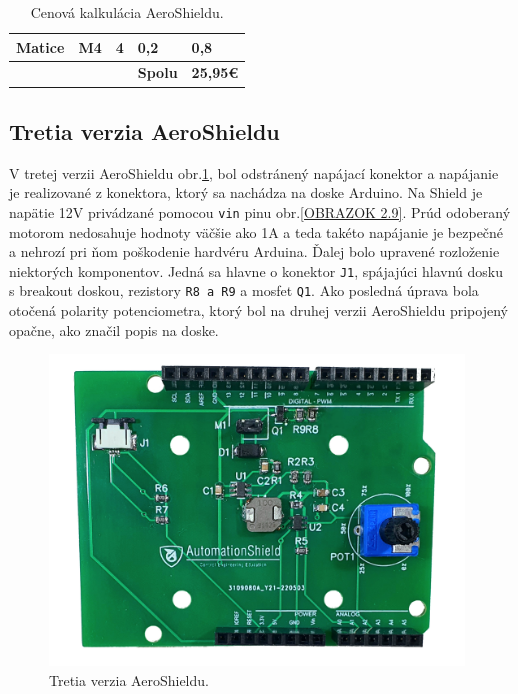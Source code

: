 \begin{table}
\begin{tabular}{p{} p{} p{} p{} p{}}
		Matice                              & M4                                                 & 4                                  & 0,2                                      & 0,8                                        \\ \hline
		\multicolumn{1}{|l}{}               &                                                    & \multicolumn{1}{l}{}               & \textbf{Spolu}                           & \multicolumn{1}{c|}{\textbf{25,95\euro}}        \\ \hline
	\end{tabular}
\caption{Cenová kalkulácia AeroShieldu.}
\label{Cenova kalkulacia}
\end{table}

\subsection{Tretia verzia AeroShieldu}

V tretej verzii AeroShieldu obr.\ref{OBRAZOK 2.8}, bol odstránený napájací konektor a napájanie je realizované z konektora, ktorý sa nachádza na doske Arduino. Na Shield je napätie 12V privádzané pomocou \verb|vin| pinu obr.\ref{OBRAZOK 2.9}. Prúd odoberaný motorom nedosahuje hodnoty väčšie ako 1A a teda takéto napájanie je bezpečné a nehrozí pri ňom poškodenie hardvéru Arduina. Ďalej bolo upravené rozloženie niektorých komponentov. Jedná sa hlavne o konektor \verb|J1|, spájajúci hlavnú dosku s breakout doskou, rezistory \verb|R8 a R9| a mosfet \verb|Q1|. Ako posledná úprava bola otočená polarity potenciometra, ktorý bol na druhej verzii AeroShieldu pripojený opačne, ako značil popis na doske. 

\begin{figure}[!tbh]
	\centering
	\includegraphics[width=110mm]{obr/NewAeroShield.png}
	\caption{Tretia verzia AeroShieldu.}\label{OBRAZOK 2.8}
\end{figure}

